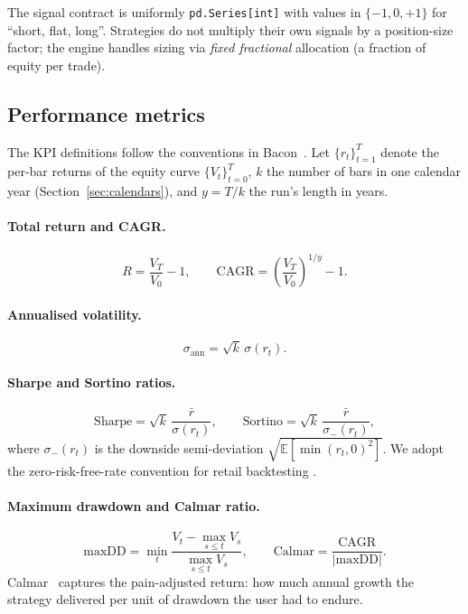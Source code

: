 The signal contract is uniformly \texttt{pd.Series[int]} with values in
$\{-1, 0, +1\}$ for ``short, flat, long''. Strategies do not multiply their own
signals by a position-size factor; the engine handles sizing via
\emph{fixed fractional} allocation (a fraction of equity per trade).

\subsection{Performance metrics}
\label{sec:kpi}

The KPI definitions follow the conventions in Bacon~\cite{bacon2008}. Let
$\{r_t\}_{t=1}^{T}$ denote the per-bar returns of the equity curve
$\{V_t\}_{t=0}^{T}$, $k$ the number of bars in one calendar year
(Section~\ref{sec:calendars}), and $y = T/k$ the run's length in years.

\paragraph{Total return and CAGR.}
\begin{equation}
  R = \frac{V_T}{V_0} - 1,\qquad
  \mathrm{CAGR} = \left(\frac{V_T}{V_0}\right)^{1/y} - 1.
\end{equation}

\paragraph{Annualised volatility.}
\begin{equation}
  \sigma_{\text{ann}} = \sqrt{k}\,\sigma(r_t).
\end{equation}

\paragraph{Sharpe and Sortino ratios.}
\begin{equation}
  \mathrm{Sharpe} = \sqrt{k}\,\frac{\bar r}{\sigma(r_t)},\qquad
  \mathrm{Sortino} = \sqrt{k}\,\frac{\bar r}{\sigma_{-}(r_t)},
\end{equation}
where $\sigma_{-}(r_t)$ is the downside semi-deviation $\sqrt{\mathbb{E}[\min(r_t, 0)^2]}$.
We adopt the zero-risk-free-rate convention for retail backtesting
\cite{sharpe1966,sortino1994}.

\paragraph{Maximum drawdown and Calmar ratio.}
\begin{equation}
  \mathrm{maxDD} = \min_{t} \frac{V_t - \max_{s \le t} V_s}{\max_{s \le t} V_s},\qquad
  \mathrm{Calmar} = \frac{\mathrm{CAGR}}{|\mathrm{maxDD}|}.
\end{equation}
Calmar~\cite{young1991} captures the pain-adjusted return: how much annual growth
the strategy delivered per unit of drawdown the user had to endure.


